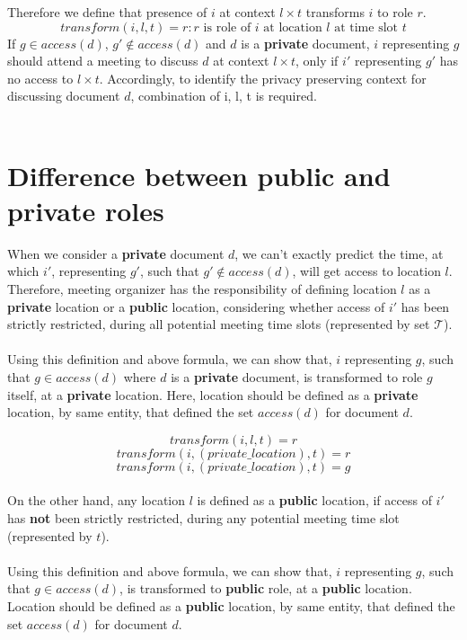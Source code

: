 \documentclass{article}
\begin{document}
Therefore we define that presence of $i$ at context $l \times t$ transforms $i$ to role $r$.
\[ transform(i, l, t) = r : r \text{ is role of } i \text{ at location } l \text{ at time slot } t \] 
\noindent
If $g \in access(d)$, $g' \notin access(d)$ and $d$ is a \textbf{private} document, $i$ representing $g$ should attend a meeting to discuss $d$ at context $l \times t$, only if $i'$ representing $g'$ has no access to $l \times t$. Accordingly, to identify the privacy preserving context for discussing document $d$, combination of i, l, t is required.\\ \\



\section{Difference between public and private roles}
When we consider a \textbf{private} document $d$, we can't exactly predict the time, at which $i'$, representing $g'$, such that $g' \notin access(d)$, will get access to location $l$. 
Therefore, meeting organizer has the responsibility of defining location $l$ as a \textbf{private} location or a \textbf{public} location, considering whether access of $i'$ has been strictly restricted, during all potential meeting time slots (represented by set $\mathcal{T}$).\\ \\
Using this definition and above formula, we can show that, $i$ representing $g$, such that $g \in access(d)$ where $d$ is a \textbf{private} document, is transformed to role $g$ itself, at a \textbf{private} location. 
Here, location should be defined as a \textbf{private} location, by same entity, that defined the set $access(d)$ for document $d$.

\[ transform(i, l, t) = r \]
\[ transform(i, (private\_location), t) = r \]
\[ transform(i, (private\_location), t) = g \] \\

\noindent
On the other hand, any location $l$ is defined as a \textbf{public} location, if access of $i'$ has \textbf{not} been strictly restricted, during any potential meeting time slot (represented by $t$).\\ \\
Using this definition and above formula, we can show that, $i$ representing $g$, such that $g \in access(d)$, is transformed to \textbf{public} role, at a \textbf{public} location.
Location should be defined as a \textbf{public} location, by same entity, that defined the set $access(d)$ for document $d$.
\end{document}
